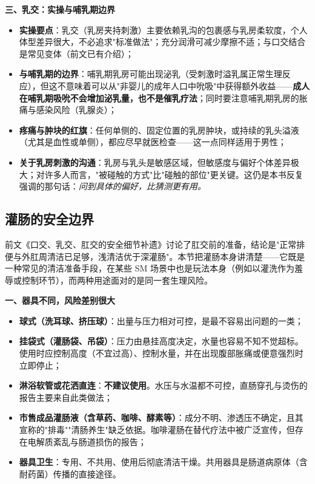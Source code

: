 \documentclass[12pt,UTF8]{ctexbook}
\begin{document}
\textbf{三、乳交：实操与哺乳期边界}
\begin{itemize}
	\item \textbf{实操要点}：乳交（乳房夹持刺激）主要依赖乳沟的包裹感与乳房柔软度，个人体型差异很大，不必追求"标准做法"；充分润滑可减少摩擦不适；与口交结合是常见变体（前文已有介绍）；
	\item \textbf{与哺乳期的边界}：哺乳期乳房可能出现泌乳（受刺激时溢乳属正常生理反应），但这不意味着可以从"非婴儿的成年人口中吮吸"中获得额外收益——\textbf{成人在哺乳期吸吮不会增加泌乳量，也不是催乳疗法}；同时要注意哺乳期乳房的胀痛与感染风险（乳腺炎）；
	\item \textbf{疼痛与肿块的红旗}：任何单侧的、固定位置的乳房肿块，或持续的乳头溢液（尤其是血性或单侧），都应尽早就医检查——这一点同样适用于男性；
	\item \textbf{关于乳房刺激的沟通}：乳房与乳头是敏感区域，但敏感度与偏好个体差异极大；对许多人而言，"被碰触的方式"比"碰触的部位"更关键。这仍是本书反复强调的那句话：\emph{问到具体的偏好，比猜测更有用。}
\end{itemize}

\subsection{灌肠的安全边界}

前文《口交、乳交、肛交的安全细节补遗》讨论了肛交前的准备，结论是"正常排便与外肛周清洁已足够，浅清洁优于深灌肠"。本节把灌肠本身讲清楚——它既是一种常见的清洁准备手段，在某些 SM 场景中也是玩法本身（例如以灌洗作为羞辱或控制环节），而两种用途面对的是同一套生理风险。

\textbf{一、器具不同，风险差别很大}

\begin{itemize}
	\item \textbf{球式（洗耳球、挤压球）}：出量与压力相对可控，是最不容易出问题的一类；
	\item \textbf{挂袋式（灌肠袋、吊袋）}：压力由悬挂高度决定，水量也容易不知不觉超标。使用时应控制高度（不宜过高）、控制水量，并在出现腹部胀痛或便意强烈时立即停止；
	\item \textbf{淋浴软管或花洒直连}：\textbf{不建议使用}。水压与水温都不可控，直肠穿孔与烫伤的报告主要来自此类做法；
	\item \textbf{市售成品灌肠液（含草药、咖啡、酵素等）}：成分不明、渗透压不确定，且其宣称的"排毒""清肠养生"缺乏依据。咖啡灌肠在替代疗法中被广泛宣传，但存在电解质紊乱与肠道损伤的报告；
	\item \textbf{器具卫生}：专用、不共用、使用后彻底清洁干燥。共用器具是肠道病原体（含耐药菌）传播的直接途径。
\end{itemize}
\end{document}
